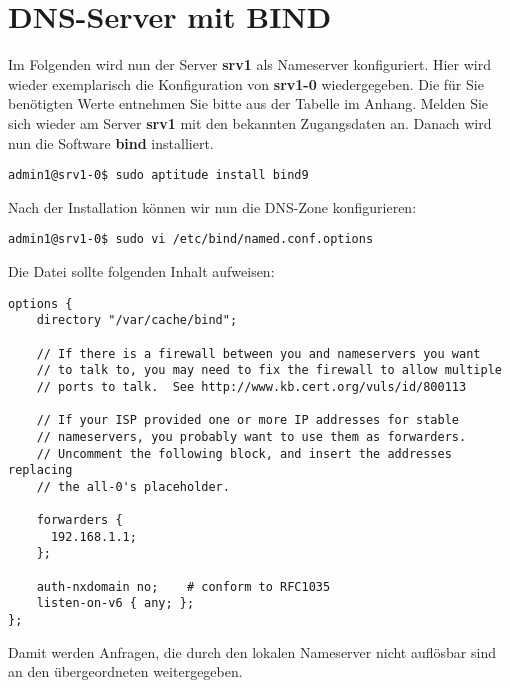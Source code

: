 \section{DNS-Server mit BIND}
Im Folgenden wird nun der Server \textbf{srv1} als Nameserver konfiguriert. Hier
wird wieder exemplarisch die Konfiguration von \textbf{srv1-0} wiedergegeben.
Die für Sie benötigten Werte entnehmen Sie bitte aus der Tabelle im Anhang.
Melden Sie sich wieder am Server \textbf{srv1} mit den bekannten Zugangsdaten
an. Danach wird nun die Software \textbf{bind} installiert.

\begin{lstlisting}
admin1@srv1-0$ sudo aptitude install bind9
\end{lstlisting}

Nach der Installation können wir nun die DNS-Zone konfigurieren:
\begin{lstlisting}
admin1@srv1-0$ sudo vi /etc/bind/named.conf.options
\end{lstlisting}
Die Datei sollte folgenden Inhalt aufweisen:
\begin{scriptsize}
\begin{lstlisting}
options {
    directory "/var/cache/bind";

    // If there is a firewall between you and nameservers you want
    // to talk to, you may need to fix the firewall to allow multiple
    // ports to talk.  See http://www.kb.cert.org/vuls/id/800113
  
    // If your ISP provided one or more IP addresses for stable 
    // nameservers, you probably want to use them as forwarders.  
    // Uncomment the following block, and insert the addresses replacing
    // the all-0's placeholder.

    forwarders {
      192.168.1.1;
    };

    auth-nxdomain no;    # conform to RFC1035
    listen-on-v6 { any; };
};
\end{lstlisting}
\end{scriptsize}

Damit werden Anfragen, die durch den lokalen Nameserver nicht auflösbar sind an den übergeordneten weitergegeben.

